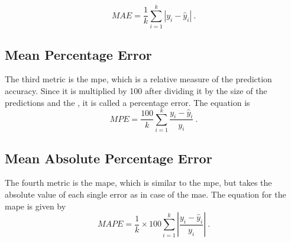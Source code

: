 \begin{equation}
MAE = \frac{1}{k} \sum_{i=1}^{k} \left|y_i-\hat{y}_i\right|~.
\end{equation}

\subsection{Mean Percentage Error}

The third metric is the \gls{mpe}, which is a relative measure of the prediction accuracy. Since it is multiplied by 100 after dividing it by the size of the predictions and the , it is called a percentage error. The equation is\\

\begin{equation}
MPE = \frac{100}{k} \sum_{i=1}^{k} \frac{y_i-\hat{y}_i}{y_i}~.
\end{equation}

\subsection{Mean Absolute Percentage Error}

The fourth metric is the \gls{mape}, which is similar to the \gls{mpe}, but takes the absolute value of each single error as in case of the \gls{mae}. The equation for the \gls{mape} is given by\\

\begin{equation}
MAPE = \frac{1}{k}\times 100 \sum_{i=1}^{k} \left|\frac{y_i-\hat{y}_i}{y_i}\right|~.
\label{eq:mape}
\end{equation}






%
%
%

